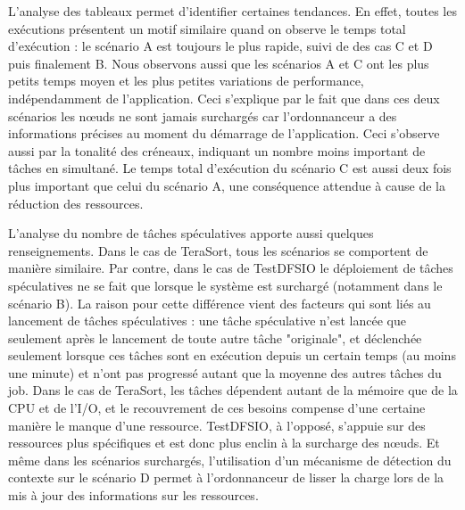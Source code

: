 L'analyse des tableaux permet d'identifier certaines tendances. En effet, toutes les exécutions présentent un motif similaire quand on observe le temps total d'exécution : le scénario A est toujours le plus rapide, suivi de des cas C et D puis finalement  B. Nous observons aussi que les scénarios A et C ont les plus petits temps moyen et les plus petites variations de performance, indépendamment de l'application. Ceci s'explique par le fait que dans ces deux scénarios les n{\oe}uds ne sont jamais surchargés car l'ordonnanceur a des informations précises au moment du démarrage de l'application. Ceci s'observe aussi par la tonalité des créneaux, indiquant un nombre moins important de tâches en simultané. Le temps total d'exécution du scénario C est aussi deux fois plus important que celui du scénario A, une conséquence attendue à cause de la réduction des ressources. 

L'analyse du nombre de tâches spéculatives apporte aussi quelques renseignements. Dans le cas de TeraSort, tous les scénarios se comportent de manière similaire. Par contre, dans le cas de TestDFSIO le déploiement de tâches spéculatives ne se fait que lorsque le système est surchargé (notamment dans le scénario B). La raison pour cette différence vient des facteurs qui sont liés au lancement de tâches spéculatives : une tâche spéculative n'est lancée que seulement après le lancement de toute autre tâche "originale", et déclenchée seulement lorsque ces tâches sont en exécution depuis un certain temps (au moins une minute) et n'ont pas progressé autant que la moyenne des autres tâches du job. Dans le cas de TeraSort, les tâches dépendent autant de la mémoire que de la CPU et de l'I/O, et le recouvrement de ces besoins compense d'une certaine manière le manque d'une ressource. TestDFSIO, à l'opposé, s'appuie sur des ressources plus spécifiques et est donc plus enclin à la surcharge des n{\oe}uds. Et même dans les scénarios surchargés, l'utilisation d'un mécanisme de détection du contexte sur le scénario D permet à l'ordonnanceur de lisser la charge lors de la mis à jour des informations sur les ressources.


